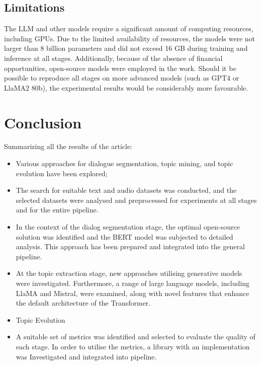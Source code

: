 \documentclass[PMI,VKR]{HSEUniversity}
\begin{document}
\section{Limitations}

The LLM and other models require a significant amount of computing resources, including GPUs. Due to the limited availability of resources, the models were not larger than 8 billion parameters and did not exceed 16 GB during training and inference at all stages. 
Additionally, because of the absence of financial opportunities, open-source models were employed in the work. Should it be possible to reproduce all stages on more advanced models (such as GPT4 or LlaMA2 80b), the experimental results would be considerably more favourable.

\chapter*{Conclusion}

Summarizing all the results of the article:
\begin{itemize}
    \item Various approaches for dialogue segmentation, topic mining, and topic evolution have been explored;
    \item The search for suitable text and audio datasets was conducted, and the selected datasets were analysed and preprocessed for experiments at all stages and for the entire pipeline.
    \item In the context of the dialog segmentation stage, the optimal open-source solution was identified and the BERT model was subjected to detailed analysis.  This approach has been prepared and integrated into the general pipeline.
    \item At the topic extraction stage, new approaches utilising generative models were investigated. Furthermore, a range of large language models, including LlaMA and Mistral, were examined, along with novel features that enhance the default architecture of the Transformer.
    \item Topic Evolution
    \item A suitable set of metrics was identified and selected to evaluate the quality of each stage. In order to utilise the metrics, a library with an implementation was Investigated and integrated into pipeline.
\end{itemize}

\putbibliography
\end{document}
